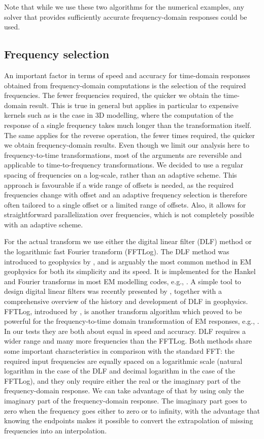 \documentclass[extra, camera,%
]{gji}
\begin{document}
Note that while we use these two algorithms for the numerical examples, any
solver that provides sufficiently accurate frequency-domain responses could be
used.

\subsection{Frequency selection}  %

An important factor in terms of speed and accuracy for time-domain responses
obtained from frequency-domain computations is the selection of the required
frequencies. The fewer frequencies required, the quicker we obtain the
time-domain result. This is true in general but applies in particular to
expensive kernels such as is the case in 3D modelling, where the computation of
the response of a single frequency takes much longer than the transformation
itself. The same applies for the reverse operation, the fewer times required,
the quicker we obtain frequency-domain results. Even though we limit our
analysis here to frequency-to-time transformations, most of the arguments are
reversible and applicable to time-to-frequency transformations. We decided to
use a regular spacing of frequencies on a log-scale, rather than an adaptive
scheme. This approach is favourable if a wide range of offsets is needed, as
the required frequencies change with offset and an adaptive frequency selection
is therefore often tailored to a single offset or a limited range of offsets.
Also, it allows for straightforward parallelization over frequencies, which is
not completely possible with an adaptive scheme.

For the actual transform we use either the digital linear filter (DLF) method
or the logarithmic fast Fourier transform (FFTLog). The DLF method was
introduced to geophysics by \cite{GP.71.Ghosh}, and is arguably the most common
method in EM geophysics for both its simplicity and its speed. It is
implemented for the Hankel and Fourier transforms in most EM modelling codes,
e.g., \cite{GEO.09.Key}. A simple tool to design digital linear filters was
recently presented by \cite{GEO.19.Werthmuller}, together with a comprehensive
overview of the history and development of DLF in geophysics. FFTLog,
introduced by \cite{RAS.00.Hamilton}, is another transform algorithm which
proved to be powerful for the frequency-to-time domain transformation of EM
responses, e.g., \cite{INT.14.Werthmuller}. In our tests they are both about
equal in speed and accuracy. DLF requires a wider range and many more
frequencies than the FFTLog. Both methods share some important characteristics
in comparison with the standard FFT: the required input frequencies are equally
spaced on a logarithmic scale (natural logarithm in the case of the DLF and
decimal logarithm in the case of the FFTLog), and they only require either the
real or the imaginary part of the frequency-domain response. We can take
advantage of that by using only the imaginary part of the frequency-domain
response. The imaginary part goes to zero when the frequency goes either to
zero or to infinity, with the advantage that knowing the endpoints makes it
possible to convert the extrapolation of missing frequencies into an
interpolation.
\end{document}
